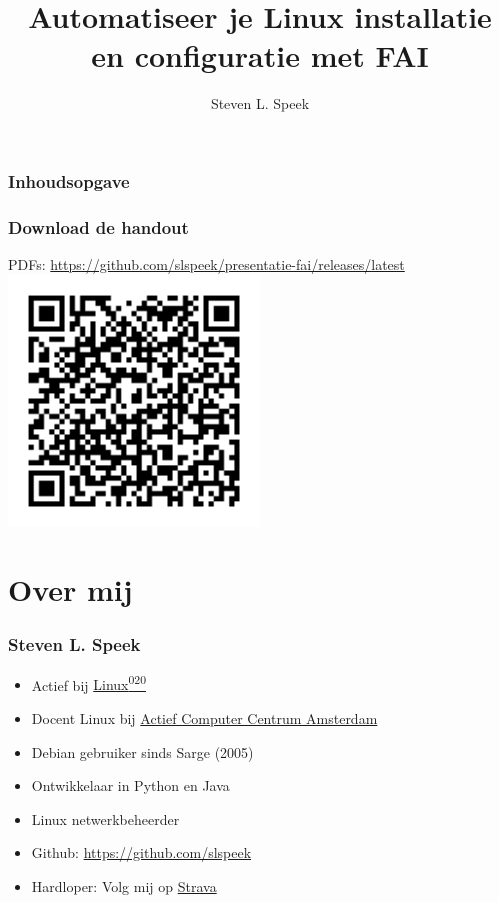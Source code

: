 \documentclass{beamer}
\title[Automatiseer installatie en configuratie] %
{Automatiseer je Linux installatie en configuratie met FAI}
\author[S.L.Speek] %
{Steven L. Speek}
\institute[NLLGG] %
{
  Nederlandse Linux Gebruikers Groep 
}
\date{\displaydate{date}}
\newcommand{\reponame}{presentatie-fai}
\begin{document}
\frame{\titlepage}


\begin{frame}
\frametitle{Inhoudsopgave}
\tableofcontents
\end{frame}
\begin{frame}
\frametitle{Download de handout}
PDFs: \url{https://github.com/slspeek/\reponame/releases/latest}
\centering
\includegraphics[width=0.5\textwidth]{img/qr-release.png}
\end{frame}

\section{Over mij}


\begin{frame}
\frametitle{Steven L. Speek}
\begin{itemize}
  \item<2-> Actief bij \href{https://linux020.nl/}{Linux\textsuperscript{020}}
  \item<3-> Docent Linux bij \href{https://accscip.nl/}{Actief Computer Centrum Amsterdam}
  \item<4-> Debian gebruiker sinds Sarge (2005)
  \item<5-> Ontwikkelaar in Python en Java  
  \item<6-> Linux netwerkbeheerder
  \item<7-> Github: \url{https://github.com/slspeek}
  \item<8-> Hardloper: Volg mij op \href{https://www.strava.com/athletes/123214921}{Strava}
\end{itemize}
\end{frame}
\end{document}
